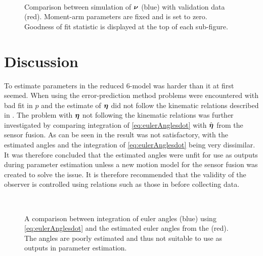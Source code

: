 \begin{figure}[tbp]
  \centering
  \qquad
  \\
  \caption{\label{fig:ResultKalmanFixedMomentArmsLz6}%
    Comparison between simulation of $\boldsymbol{\nu}$ (blue) with validation data (red). Moment-arm parameters are fixed and  is set to zero. Goodness of fit statistic is displayed at the top of each sub-figure.}
\end{figure}


\section{Discussion}
To estimate parameters in the reduced 6-\abbrDOF model was harder than it at first seemed. When using the error-prediction method problems were encountered with bad fit in $p$ and the estimate of $\boldsymbol{\eta}$ did not follow the kinematic relations described in . The problem with $\boldsymbol{\eta}$ not following the kinematic relations was further investigated by comparing integration of \eqref{eq:eulerAnglesdot} with $\hat{\boldsymbol{\eta}}$ from the sensor fusion. As can be seen in  the result was not satisfactory, with the estimated angles and the integration of \eqref{eq:eulerAnglesdot} being very dissimilar. It was therefore concluded that the estimated angles were unfit for use as outputs during parameter estimation unless a new motion model for the sensor fusion was created to solve the issue. It is therefore recommended that the validity of the observer is controlled using relations such as those in  before collecting data. 

\begin{figure}[htbp]
  \centering
  \qquad
  \\
  \caption{\label{fig:integratedAngleVelocities}%
  A comparison between integration of euler angles (blue) using \eqref{eq:eulerAnglesdot} and the estimated euler angles from the \abbrEKF (red). The angles are poorly estimated and thus not suitable to use as outputs in parameter estimation.}
\end{figure}

